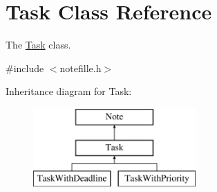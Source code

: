 \hypertarget{classTask}{}\section{Task Class Reference}
\label{classTask}


The \hyperlink{classTask}{Task} class.  




{\ttfamily \#include $<$notefille.\+h$>$}

Inheritance diagram for Task\+:\begin{figure}[H]
\begin{center}
\leavevmode
\includegraphics[height=3.000000cm]{classTask}
\end{center}
\end{figure}

